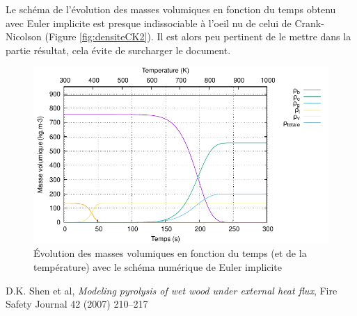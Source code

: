 \documentclass[a4paper,11pt]{article}
\begin{document}
\vspace{2cm}

Le schéma de l'évolution des masses volumiques en fonction du temps obtenu avec Euler implicite est presque indissociable à l'oeil nu de celui de Crank-Nicolson (Figure \ref{fig:densiteCK2}). Il est alors peu pertinent de le mettre dans la partie résultat, cela évite de surcharger le document.
\begin{figure}[H]
    \centering
    \includegraphics[width=1\linewidth]{images/densite_Euler.pdf}
    \caption{Évolution des masses volumiques en fonction du temps (et de la température) avec le schéma numérique de Euler implicite }
    \label{fig:densiteEI}
\end{figure}


\newpage
\begin{thebibliography}{99}


     D.K. Shen et al, \textit{Modeling pyrolysis of wet wood under external heat flux}, Fire Safety Journal 42 (2007) 210–217

\end{thebibliography}
\end{document}
